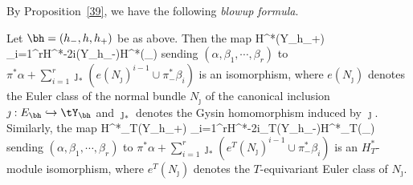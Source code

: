 By Proposition~\ref{39}, we have the following 
 \emph{blowup formula}.
\begin{proposition} \label{16} Let $\bh=(h_-,h,h_+)$ be as above. Then the map
	\beq \label{17} H^*(Y_{h_+}) \oplus \bigoplus_{i=1}^{r}H^{*-2i}(Y_{h_-})\xrightarrow{~\cong~}H^*(\tY_{\bh})\eeq
	sending $(\alpha,\beta_1,\cdots,\beta_{r})$ to  $\pi^*\alpha+
	\sum_{i=1}^{r} \jmath_*(e(N_\jmath)^{i-1}\cup \pi_-^*\beta_i)$
	is an isomorphism,
	where $e(N_\jmath)$ denotes the Euler class of the normal bundle $N_\jmath$ of the canonical inclusion $\jmath:E_{\bh}\hookrightarrow \tY_{\bh}$ 
	and $\jmath_*$ denotes the Gysin homomorphism induced by $\jmath$. 
	Similarly, the map
	\beq \label{18} H^*_T(Y_{h_+}) \oplus \bigoplus_{i=1}^{r}H^{*-2i}_T(Y_{h_-})\xrightarrow{~\cong~}H^*_T(\tY_{\bh})\eeq
	sending $(\alpha,\beta_1,\cdots,\beta_{r})$ to  $\pi^*\alpha+
	\sum_{i=1}^{r} \jmath_*(e^T(N_\jmath)^{i-1}\cup \pi_-^*\beta_i)
	$
	is an $H^*_T$-module isomorphism, where $e^T(N_\jmath)$ denotes the $T$-equivariant Euler class of $N_\jmath$. 
\end{proposition}

